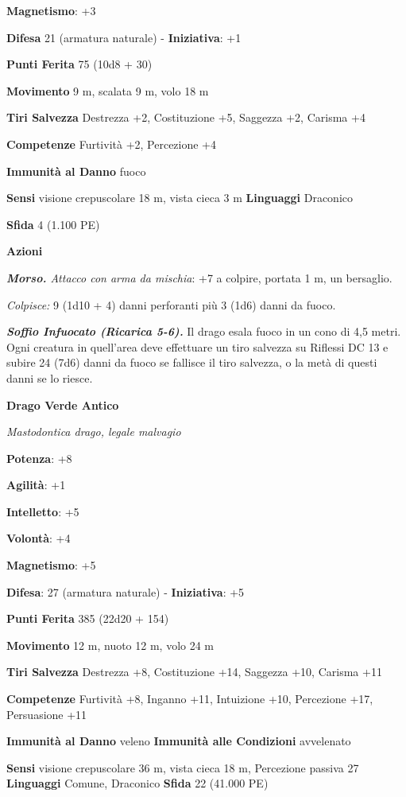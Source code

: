 \begin{multicols}{2}
\textbf{Magnetismo}: +3

\textbf{Difesa} 21 (armatura naturale) - \textbf{Iniziativa}: +1

\textbf{Punti Ferita} 75 (10d8 + 30)

\textbf{Movimento} 9 m, scalata 9 m, volo 18 m

\textbf{Tiri Salvezza} Destrezza +2, Costituzione +5, Saggezza +2,
Carisma +4

\textbf{Competenze} Furtività +2, Percezione +4

\textbf{Immunità al Danno} fuoco

\textbf{Sensi} visione crepuscolare 18 m, vista cieca 3 m
\textbf{Linguaggi} Draconico

\textbf{Sfida} 4 (1.100 PE)\smallskip

\smallskip\textbf{Azioni}

\emph{\textbf{Morso.} Attacco con arma da mischia}: +7 a colpire,
portata 1 m, un bersaglio.

\emph{Colpisce:} 9 (1d10 + 4) danni perforanti più 3 (1d6) danni da
fuoco.

\emph{\textbf{Soffio Infuocato (Ricarica 5-6).}} Il drago esala fuoco in
un cono di 4,5 metri. Ogni creatura in quell'area deve effettuare un
tiro salvezza su Riflessi DC 13 e subire 24 (7d6) danni da fuoco se
fallisce il tiro salvezza, o la metà di questi danni se lo riesce.

\textbf{Drago Verde Antico}

\emph{Mastodontica drago, legale malvagio}

\textbf{Potenza}: +8

\textbf{Agilità}: +1

\textbf{Intelletto}: +5

\textbf{Volontà}: +4

\textbf{Magnetismo}: +5

\textbf{Difesa}: 27 (armatura naturale) - \textbf{Iniziativa}: +5

\textbf{Punti Ferita} 385 (22d20 + 154)

\textbf{Movimento} 12 m, nuoto 12 m, volo 24 m

\textbf{Tiri Salvezza} Destrezza +8, Costituzione +14, Saggezza +10,
Carisma +11

\textbf{Competenze} Furtività +8, Inganno +11, Intuizione +10, Percezione
+17, Persuasione +11

\textbf{Immunità al Danno} veleno \textbf{Immunità alle Condizioni}
avvelenato

\textbf{Sensi} visione crepuscolare 36 m, vista cieca 18 m, Percezione passiva
27 \textbf{Linguaggi} Comune, Draconico \textbf{Sfida} 22 (41.000 PE)\smallskip


\end{multicols}
